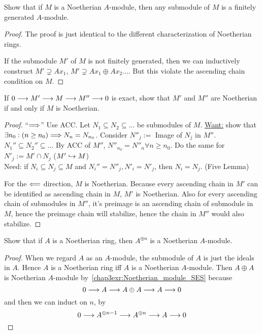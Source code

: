 \documentclass[11pt,fleqn]{book}
\begin{document}
\begin{exr}\label{chap3exr:submodule_Notherian}
Show that if $ M$ is a Noetherian $A$-module, then any submodule of $M$ is a finitely generated $A$-module.
\end{exr}
\begin{proof}
The proof is just identical to the different characterization of Noetherian rings.

If the submodule $M'$ of $M$ is not finitely generated, then we can inductively construct $M'\supsetneq A x_1$, $M'\supsetneq A x_1\oplus Ax_2...$. But this violate the ascending chain condition on $M$.
\end{proof}

\begin{exr}\label{chap3exr:Noetherian_module_SES}
If $0\longrightarrow M' \longrightarrow M\longrightarrow M'' \longrightarrow 0$ is exact, show that $M'$ and $M''$ are Noetherian if and only if $M$ is Noetherian.
\end{exr}
\begin{proof}
``$\Longrightarrow$'' Use ACC. Let $N_1\subseteq N_2\subseteq ...$ be submodules of $M$. \underline{Want:}  show that $\exists n_0 :(n\geq n_0)\Longrightarrow N_n=N_{n_0}$.
Consider $N''_j:=$ Image of $N_j$ in $M''$. $ N_1''\subseteq N_2''\subseteq ...$ By ACC of $M''$, $N''_{n_0}=N''_{n}\forall n\geq n_0$. Do the same for $N'_j:=M'\cap N_j$ ($M'\hookrightarrow M$)\\
Need: if $N_i\subseteq N_j\subseteq M$ and $N_i''=N''_j, N'_i=N'_j$, then $N_i=N_j$. (Five Lemma)
\begin{center}
\end{center}

For the $\Longleftarrow$ direction, $M$ is Noetherian. Because every ascending chain in $M'$ can be identified as ascending chain in $M$, $M'$ is Noetherian. Also for every ascending chain of submodules in $M''$, it's preimage is an ascending chain of submodule in $M$, hence the preimage chain will stabilize, hence the chain in $M''$ would also stabilize.
\end{proof}

\begin{exr}
Show that if $A$ is a Noetherian ring, then $A^{\oplus n}$ is a Noetherian
$A$-module.
\end{exr}
\begin{proof}
When we regard $A$ as an $A$-module, the submodule of $A$ is just the ideals in $A$. Hence $A$ is a Noetherian ring iff $A$ is a Noetherian $A$-module. Then $A\oplus A$ is Noetherian $A$-module by~\ref{chap3exr:Noetherian_module_SES} because
$$
0\longrightarrow A\longrightarrow A\oplus A\longrightarrow A\longrightarrow 0
$$
and then we can induct on $n$, by 
$$
0\longrightarrow A^{\oplus{n-1}}\longrightarrow A^{\oplus n}\longrightarrow A\longrightarrow 0
$$
\end{proof}
\end{document}
